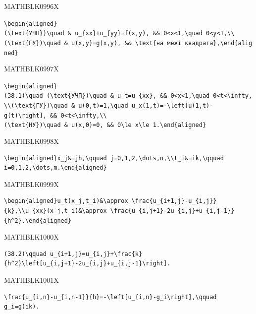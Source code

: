 \documentclass[
  ukrainian,
]{article}
\begin{document}
MATHBLK0996X

\texttt{\textbackslash{}begin\{aligned\}(\textbackslash{}text\{УЧП\})\textbackslash{}quad\ \&\ u\_\{xx\}+u\_\{yy\}=f(x,y),\ \&\&\ 0\textless{}x\textless{}1,\textbackslash{}quad\ 0\textless{}y\textless{}1,\textbackslash{}\textbackslash{}(\textbackslash{}text\{ГУ\})\textbackslash{}quad\ \&\ u(x,y)=g(x,y),\ \&\&\ \textbackslash{}text\{на\ межі\ квадрата\},\textbackslash{}end\{aligned\}}

MATHBLK0997X

\texttt{\textbackslash{}begin\{aligned\}(38.1)\textbackslash{}quad\ (\textbackslash{}text\{УЧП\})\textbackslash{}quad\ \&\ u\_t=u\_\{xx\},\ \&\&\ 0\textless{}x\textless{}1,\textbackslash{}quad\ 0\textless{}t\textless{}\textbackslash{}infty,\textbackslash{}\textbackslash{}(\textbackslash{}text\{ГУ\})\textbackslash{}quad\ \&\ u(0,t)=1,\textbackslash{}quad\ u\_x(1,t)=-\textbackslash{}left{[}u(1,t)-g(t)\textbackslash{}right{]},\ \&\&\ 0\textless{}t\textless{}\textbackslash{}infty,\textbackslash{}\textbackslash{}(\textbackslash{}text\{НУ\})\textbackslash{}quad\ \&\ u(x,0)=0,\ \&\&\ 0\textbackslash{}le\ x\textbackslash{}le\ 1.\textbackslash{}end\{aligned\}}

MATHBLK0998X

\begin{verbatim}
\begin{aligned}x_j&=jh,\qquad j=0,1,2,\dots,n,\\t_i&=ik,\qquad i=0,1,2,\dots,m.\end{aligned}
\end{verbatim}

MATHBLK0999X

\begin{verbatim}
\begin{aligned}u_t(x_j,t_i)&\approx \frac{u_{i+1,j}-u_{i,j}}{k},\\u_{xx}(x_j,t_i)&\approx \frac{u_{i,j+1}-2u_{i,j}+u_{i,j-1}}{h^2}.\end{aligned}
\end{verbatim}

MATHBLK1000X

\begin{verbatim}
(38.2)\qquad u_{i+1,j}=u_{i,j}+\frac{k}{h^2}\left[u_{i,j+1}-2u_{i,j}+u_{i,j-1}\right].
\end{verbatim}

MATHBLK1001X

\begin{verbatim}
\frac{u_{i,n}-u_{i,n-1}}{h}=-\left[u_{i,n}-g_i\right],\qquad g_i=g(ik).
\end{verbatim}
\end{document}
